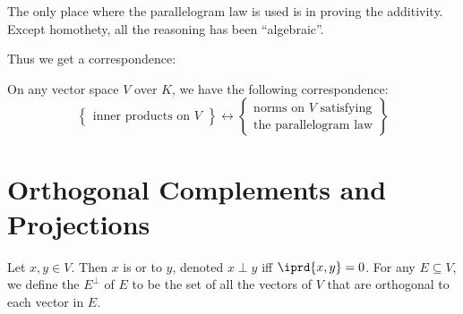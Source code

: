	\begin{rmk}
		The only place where the parallelogram law is used is in proving the additivity. Except homothety, all the reasoning has been ``algebraic''.
	\end{rmk}
	
	Thus we get a correspondence:
	
	\begin{cor}
		On any vector space $V$ over $K$, we have the following correspondence:
		\[
		\left\{ 
		\begin{gathered}
			\text{inner products on $V$}
		\end{gathered}
		\right\}
		\longleftrightarrow
		\left\{
		\begin{gathered}
			\text{norms on $V$ satisfying}\\
			\text{the parallelogram law}
		\end{gathered}
		\right\}
		\]
	\end{cor}
	
	\begin{comment}
	Here are some helpful lemmas to be used later:
	
	\begin{lem}
		If $\{x_0\}^\perp$ is dense in $V$, then $x_0 = 0$.
	\end{lem}
	
	\begin{proof}
		Let $\epsilon > 0$. Since \uline{$E$ is dense}, take a $y\perp x_0$ such that $\norm{y - x_0} < \epsilon$. Now, $\norm{x_0}^2 = \iprd{x_0, x_0 - y} + \iprd{x_0, y} = \iprd{x_0, x_0 - y}\le \norm{x_0}\norm{x_0 - y}\le \epsilon\norm{x_0}\wimplies \norm{x_0}\le\epsilon$.
	\end{proof}
	
	\begin{lem}
		Let $x_0, y_0\in V$ and $E := \{z\in V : z\perp x_0\implies z\perp y_0\}$ be dense in $V$. Then $y_0$ is a multiple of $x_0$.
	\end{lem}
	
	\begin{proof}
		Let 
	\end{proof}
	\end{comment}
	
	
\section{Orthogonal Complements and Projections}

	Let $x, y\in V$. Then $x$ is \stb {} or  to $y$, denoted $x\perp y$ iff $\iprd{x, y} = 0$. For any $E\subseteq V$, we define the  $E^\perp$ of $E$ to be the set of all the vectors of $V$ that are orthogonal to each vector in $E$.
	
